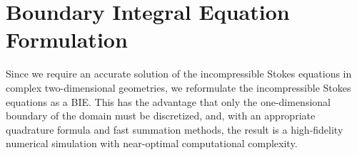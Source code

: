 \documentclass[preprint,10pt]{elsarticle}
\begin{document}
\section{Boundary Integral Equation Formulation}
\label{sec:DLP}
Since we require an accurate solution of the incompressible Stokes
equations in complex two-dimensional geometries, we reformulate the
incompressible Stokes equations as a BIE.  This has the advantage that
only the one-dimensional boundary of the domain must be discretized,
and, with an appropriate quadrature formula and fast summation methods,
the result is a high-fidelity numerical simulation with near-optimal
computational complexity.

\end{document}
